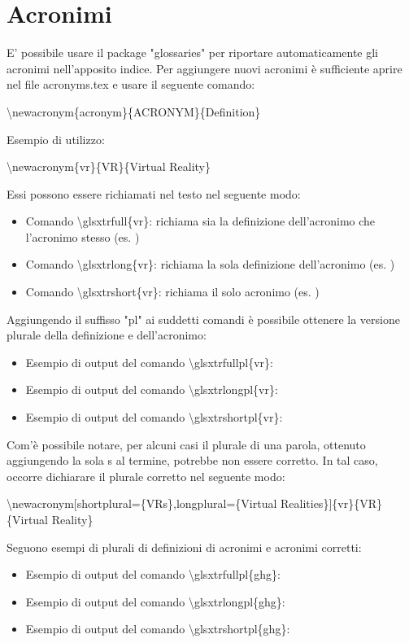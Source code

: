 
\section{Acronimi}
E' possibile usare il package "glossaries" per riportare automaticamente gli acronimi nell'apposito indice.
Per aggiungere nuovi acronimi è sufficiente aprire nel file acronyms.tex e usare il seguente comando:
\begin{center}
\textbackslash newacronym\{acronym\}\{ACRONYM\}\{Definition\}
\end{center}
Esempio di utilizzo:
\begin{center}
    \textbackslash newacronym\{vr\}\{VR\}\{Virtual Reality\}
\end{center}
Essi possono essere richiamati nel testo nel seguente modo:
\begin{itemize}
    \item Comando \textbackslash glsxtrfull\{vr\}: richiama sia la definizione dell'acronimo che l'acronimo stesso (es. )
    \item Comando \textbackslash glsxtrlong\{vr\}: richiama la sola definizione dell'acronimo (es. )
    \item Comando \textbackslash glsxtrshort\{vr\}: richiama il solo acronimo (es. )
\end{itemize}
Aggiungendo il suffisso "pl" ai suddetti comandi è possibile ottenere la versione plurale della definizione e dell'acronimo:
\begin{itemize}
    \item Esempio di output del comando \textbackslash glsxtrfullpl\{vr\}: 
    \item Esempio di output del comando \textbackslash glsxtrlongpl\{vr\}: 
    \item Esempio di output del comando \textbackslash glsxtrshortpl\{vr\}: 
\end{itemize}
Com'è possibile notare, per alcuni casi il plurale di una parola, ottenuto aggiungendo la sola s al termine, potrebbe non essere corretto. In tal caso, occorre dichiarare il plurale corretto nel seguente modo:
\begin{center}
\textbackslash newacronym[shortplural=\{VRs\},longplural=\{Virtual Realities\}]\{vr\}\{VR\}\{Virtual Reality\}
\end{center}
Seguono esempi di plurali di definizioni di acronimi e acronimi corretti:
\begin{itemize}
    \item Esempio di output del comando \textbackslash glsxtrfullpl\{ghg\}: 
    \item Esempio di output del comando \textbackslash glsxtrlongpl\{ghg\}: 
    \item Esempio di output del comando \textbackslash glsxtrshortpl\{ghg\}: 
\end{itemize}

